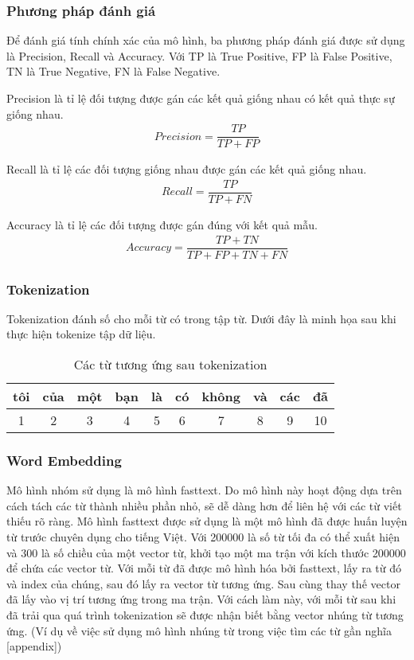 \subsubsection{Phương pháp đánh giá}
Để đánh giá tính chính xác của mô hình, ba phương pháp đánh giá được sử dụng là Precision, Recall và Accuracy. Với TP là True Positive, FP là False Positive, TN là True Negative, FN là False Negative.

Precision là tỉ lệ đối tượng được gán các kết quả giống nhau có kết quả thực sự giống nhau.
\begin{align}
    Precision=\dfrac{TP}{TP+FP}
\end{align}

Recall là tỉ lệ các đối tượng giống nhau được gán các kết quả giống nhau.
\begin{align}
    Recall=\dfrac{TP}{TP+FN}
\end{align}

Accuracy là tỉ lệ các đối tượng được gán đúng với kết quả mẫu.
\begin{align}
    Accuracy=\dfrac{TP+TN}{TP+FP+TN+FN}
\end{align}

\subsubsection{Tokenization}
Tokenization đánh số cho mỗi từ có trong tập từ. Dưới đây là minh họa sau khi thực hiện tokenize
tập dữ liệu.
\begin{table}[htb]
    \centering
    \caption{Các từ tương ứng sau tokenization}
    \begin{tabularx}{0.95\textwidth}{C{1}|C{1}|C{1}|C{1}|C{1}|C{1}|C{1}|C{1}|C{1}|C{1}}
        \toprule
        tôi & của & một & bạn & là & có & không & và & các & đã \\   & 2   & 3   & 4   & 5  & 6  & 7     & 8  & 9   & 10 \\
        \bottomrule
    \end{tabularx}
\end{table}

\subsubsection{Word Embedding}
Mô hình nhóm sử dụng là mô hình fasttext. Do mô hình này hoạt động dựa trên cách tách các từ thành nhiều phần nhỏ, sẽ dễ dàng hơn để liên hệ với các từ viết thiếu rõ ràng. Mô hình fasttext được sử dụng là một mô hình đã được huấn luyện từ trước chuyên dụng cho tiếng Việt. Với 200000 là số từ tối đa có thể xuất hiện và 300 là số chiều của một vector từ, khởi tạo một ma trận với kích thước 200000 để chứa các vector từ. Với mỗi từ đã được mô hình hóa bởi fasttext, lấy ra từ đó và index của chúng, sau đó lấy ra vector từ tương ứng. Sau cùng thay thế vector đã lấy vào vị trí tương ứng trong ma trận. Với cách làm này, với mỗi từ sau khi đã trải qua quá trình tokenization sẽ được nhận biết bằng vector nhúng từ tương ứng. (Ví dụ về việc sử dụng mô hình nhúng từ trong việc tìm các từ gần nghĩa [appendix])